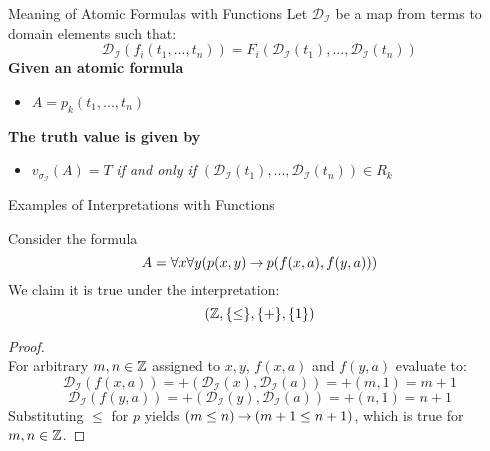 \begin{wideslide}[bm=,toc=]{Meaning of Atomic Formulas with Functions}
Let $\mathcal{D}_{\mathcal{I}}$ be a map from terms to domain elements such that:
\[
 \mathcal{D}_{\mathcal{I}} (f_i(t_1,...,t_n)) = F_i(\mathcal{D}_{\mathcal{I}}(t_1),...,\mathcal{D}_{\mathcal{I}}(t_n)) 
  \]
\pause
{\bf Given an atomic formula} 
\begin{itemize}
\item $A = p_k(t_1,...,t_n)$
\end{itemize}
\pause
{\bf The truth value is given by}
\begin{itemize}
\item $v_{\sigma_{\mathcal{I}}}(A) = T$ \emph{if and only if} $(\mathcal{D}_{\mathcal{I}}(t_1),...,\mathcal{D}_{\mathcal{I}}(t_n)) \in R_k$
\end{itemize}
\end{wideslide}
\begin{wideslide}[bm=,toc=]{Examples of Interpretations with Functions}
\begin{ex}{9.4}
Consider the formula
\[
  A = \forall x \forall y(p(x,y) \mathbin{\rightarrow} p(f(x,a),f(y,a)))
\]
We claim it is true under the interpretation:
\[
  (\mathbb{Z},\{\leq\}, \{+\}, \{1\}) 
\]
\vspace{-4ex}
\pause
\begin{proof}
~\\For arbitrary $m,n \in \mathbb{Z}$ assigned to $x,y$, $f(x,a)$ and $f(y,a)$ evaluate to:
\vspace{-1ex}
\pause
\[ \mathcal{D}_{\mathcal{I}}(f(x,a)) = +(\mathcal{D}_{\mathcal{I}}(x), \mathcal{D}_{\mathcal{I}}(a)) = +(m,1) = m+1 \]
\pause
\vspace{-4ex}
\[ \mathcal{D}_{\mathcal{I}}(f(y,a)) = +(\mathcal{D}_{\mathcal{I}}(y), \mathcal{D}_{\mathcal{I}}(a)) = +(n,1) = n+1 \]
\pause
Substituting $\leq$ for $p$ yields $(m \leq n) \mathbin{\rightarrow} (m+1 \leq n + 1)$, which is
true for $m,n \in \mathbb{Z}$.
\end{proof}
\end{ex}
\end{wideslide}

